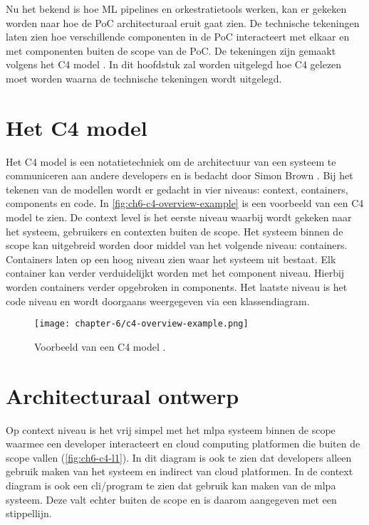 Nu het bekend is hoe ML pipelines en orkestratietools werken, kan er gekeken worden naar hoe de PoC architecturaal eruit gaat zien. De technische tekeningen laten zien hoe verschillende componenten in de PoC interacteert met elkaar en met componenten buiten de scope van de PoC. De tekeningen zijn gemaakt volgens het C4 model \cite{c4-model}. In dit hoofdstuk zal worden uitgelegd hoe C4 gelezen moet worden waarna de technische tekeningen wordt uitgelegd.

\section{Het C4 model}\label{sec:ch6-het-c4-model}
Het C4 model is een notatietechniek om de architectuur van een systeem te communiceren aan andere developers en is bedacht door Simon Brown \cite{c4-model}. Bij het tekenen van de modellen wordt er gedacht in vier niveaus: context, containers, components en code. In \autoref{fig:ch6-c4-overview-example} is een voorbeeld van een C4 model te zien. De context level is het eerste niveau waarbij wordt gekeken naar het systeem, gebruikers en contexten buiten de scope. Het systeem binnen de scope kan uitgebreid worden door middel van het volgende niveau: containers. Containers laten op een hoog niveau zien waar het systeem uit bestaat. Elk container kan verder verduidelijkt worden met het component niveau. Hierbij worden containers verder opgebroken in components. Het laatste niveau is het code niveau en wordt doorgaans weergegeven via een klassendiagram. 

\begin{figure}[hbt!]
  \centering
  \texttt{[image: chapter-6/c4-overview-example.png]}
  \caption{Voorbeeld van een C4 model \cite{c4-model}.}
  \label{fig:ch6-c4-overview-example}
\end{figure}

\newpage

\section{Architecturaal ontwerp}\label{sec:ch6-architecturaal-ontwerp}
Op context niveau is het vrij simpel met het \acrfull{mlpa} systeem binnen de scope waarmee een developer interacteert en cloud computing platformen die buiten de scope vallen (\autoref{fig:ch6-c4-l1}). In dit diagram is ook te zien dat developers alleen gebruik maken van het systeem en indirect van cloud platformen. In de context diagram is ook een \acrfull{cli}/program te zien dat gebruik kan maken van de \acrshort{mlpa} systeem. Deze valt echter buiten de scope en is daarom aangegeven met een stippellijn.

